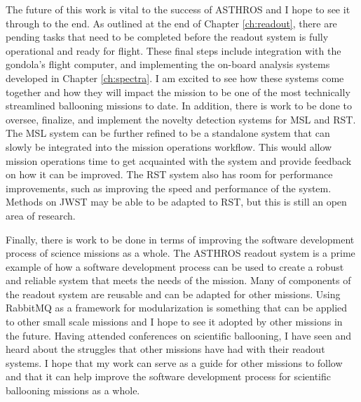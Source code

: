 The future of this work is vital to the success of ASTHROS and I hope to see it through to the end.
As outlined at the end of Chapter \ref{ch:readout}, there are pending tasks that need to be completed before the readout system is fully operational and ready for flight.
These final steps include integration with the gondola's flight computer, and implementing the on-board analysis systems developed in Chapter \ref{ch:spectra}.
I am excited to see how these systems come together and how they will impact the mission to be one of the most technically streamlined ballooning missions to date.
In addition, there is work to be done to oversee, finalize, and implement the novelty detection systems for MSL and RST.
The MSL system can be further refined to be a standalone system that can slowly be integrated into the mission operations workflow.
This would allow mission operations time to get acquainted with the system and provide feedback on how it can be improved.
The RST system also has room for performance improvements, such as improving the speed and performance of the system.
Methods on JWST may be able to be adapted to RST, but this is still an open area of research.

Finally, there is work to be done in terms of improving the software development process of science missions as a whole.
The ASTHROS readout system is a prime example of how a software development process can be used to create a robust and reliable system that meets the needs of the mission.
Many of components of the readout system are reusable and can be adapted for other missions.
Using RabbitMQ as a framework for modularization is something that can be applied to other small scale missions and I hope to see it adopted by other missions in the future.
Having attended conferences on scientific ballooning, I have seen and heard about the struggles that other missions have had with their readout systems.
I hope that my work can serve as a guide for other missions to follow and that it can help improve the software development process for scientific ballooning missions as a whole.